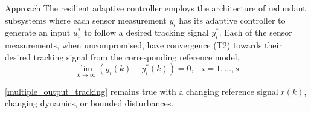 \begin{section}{Approach}
The resilient adaptive controller employs the architecture of redundant subsystems where each sensor measurement $y_i$ has its adaptive controller to generate an input $u^*_i$ to follow a desired tracking signal $y^*_i$. Each of the sensor measurements, when uncompromised, have convergence (T2) towards their desired tracking signal from the corresponding reference model,
    \begin{equation}
    \label{multiple_output_tracking}
    \lim_{k\to\infty}(y_i(k)-y^*_i(k))=0, \;\;\; i=1,\dots,s
    \end{equation}

\eqref{multiple_output_tracking} remains true with a changing reference signal $r(k)$, changing dynamics, or bounded disturbances. 



\end{section}
